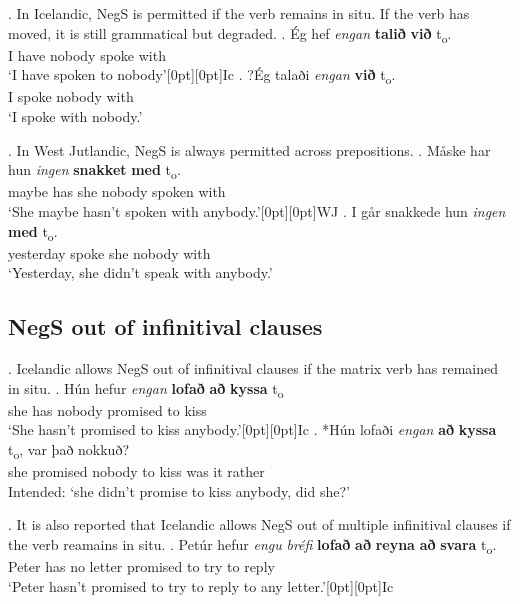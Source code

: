 \documentclass[12pt, letterpaper]{article}
\newcommand{\rcommentg}[1]{\hfill\raisebox{1.9\baselineskip}[0pt][0pt]{#1}} %
\begin{document}
\ex. In Icelandic, NegS is permitted if the verb remains in situ. If the verb has moved, it is still grammatical but degraded.
\ag. Ég hef \textit{engan} \textbf{talið} \textbf{við} t\textsubscript{o}.\\
I have nobody spoke with\\
`I have spoken to nobody'\rcommentg{Ic}
\bg. ?Ég talaði \textit{engan} \textbf{við} t\textsubscript{o}.\\
I spoke nobody with\\
`I spoke with nobody.'

\ex. In West Jutlandic, NegS is always permitted across prepositions.
\ag. Måske har hun \textit{ingen} \textbf{snakket} \textbf{med} t\textsubscript{o}.\\
maybe has she nobody spoken with\\
`She maybe hasn't spoken with anybody.'\rcommentg{WJ}
\bg. {I går} snakkede hun \textit{ingen} \textbf{med} t\textsubscript{o}.\\
yesterday spoke she nobody with\\
`Yesterday, she didn't speak with anybody.'

\subsection{NegS out of infinitival clauses}

\ex. Icelandic allows NegS out of infinitival clauses if the matrix verb has remained in situ.
\ag. Hún hefur \textit{engan} \textbf{lofað} \textbf{að} \textbf{kyssa} t\textsubscript{o}\\
she has nobody promised to kiss\\
`She hasn't promised to kiss anybody.'\rcommentg{Ic}
\bg. *Hún lofaði \textit{engan} \textbf{að} \textbf{kyssa} t\textsubscript{o}, var það nokkuð?\\
she promised nobody to kiss {} was it rather\\
Intended: `she didn't promise to kiss anybody, did she?'

\ex. It is also reported that Icelandic allows NegS out of multiple infinitival clauses if the verb reamains in situ.
\ag. Petúr hefur \textit{engu} \textit{bréfi} \textbf{lofað} \textbf{að} \textbf{reyna} \textbf{að} \textbf{svara} t\textsubscript{o}.\\
Peter has no letter promised to try to reply\\
`Peter hasn't promised to try to reply to any letter.'\rcommentg{Ic}
\end{document}
